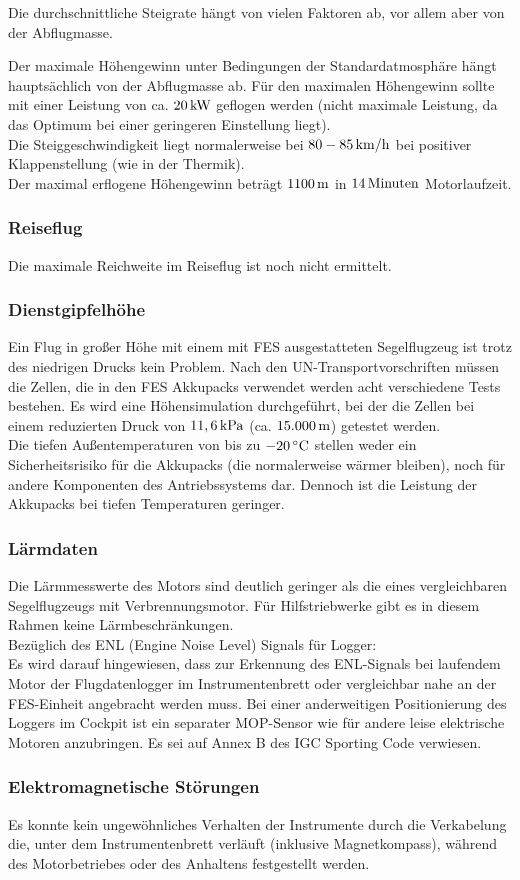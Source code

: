 Die durchschnittliche Steigrate hängt von vielen Faktoren ab, vor allem aber von der Abflugmasse.

Der maximale Höhengewinn unter Bedingungen der Standardatmosphäre hängt hauptsächlich von der Abflugmasse ab. Für den maximalen Höhengewinn sollte mit einer Leistung von ca. $\unit[20]{kW}$ geflogen werden (nicht maximale Leistung, da das Optimum bei einer geringeren Einstellung liegt).\\ 
Die Steiggeschwindigkeit liegt normalerweise bei $\unit[80-85]{km/h}$ bei positiver Klappenstellung (wie in der Thermik).\\
Der maximal erflogene Höhengewinn beträgt $\unit[1100]{m}$ in $\unit[14]{Minuten}$ Motorlaufzeit.

\subsubsection{Reiseflug}
Die maximale Reichweite im Reiseflug ist noch nicht ermittelt. 

\subsubsection{Dienstgipfelhöhe}
Ein Flug in großer Höhe mit einem mit FES ausgestatteten Segelflugzeug ist trotz des niedrigen Drucks kein Problem. Nach den UN-Transportvorschriften müssen die Zellen, die in den FES Akkupacks verwendet werden acht verschiedene Tests bestehen. Es wird eine Höhensimulation durchgeführt, bei der die Zellen bei einem reduzierten Druck von $\unit[11,6]{kPa}$ (ca. $\unit[15.000]{m}$) getestet werden.\\

Die tiefen Außentemperaturen von bis zu $\unit[-20]{^\circ C}$ stellen weder ein Sicherheitsrisiko für
die Akkupacks (die normalerweise wärmer bleiben), noch für andere Komponenten des Antriebssystems dar. Dennoch ist die Leistung der Akkupacks bei tiefen Temperaturen geringer.

\subsubsection{Lärmdaten} 
Die Lärmmesswerte des Motors sind deutlich geringer als die eines vergleichbaren Segelflugzeugs mit Verbrennungsmotor.
Für Hilfstriebwerke gibt es in diesem Rahmen keine Lärmbeschränkungen.\\

Bezüglich des ENL (Engine Noise Level) Signals für Logger:\\
Es wird darauf hingewiesen, dass zur Erkennung des ENL-Signals bei laufendem Motor der Flugdatenlogger im Instrumentenbrett oder vergleichbar nahe an der FES-Einheit angebracht werden muss. Bei einer anderweitigen Positionierung des Loggers im
Cockpit ist ein separater MOP-Sensor wie für andere leise elektrische Motoren anzubringen.
Es sei auf Annex B des IGC Sporting Code verwiesen.

\subsubsection{Elektromagnetische Störungen}
Es konnte kein ungewöhnliches Verhalten der Instrumente durch die Verkabelung die, unter dem Instrumentenbrett verläuft (inklusive Magnetkompass), während des Motorbetriebes oder des Anhaltens festgestellt werden.




